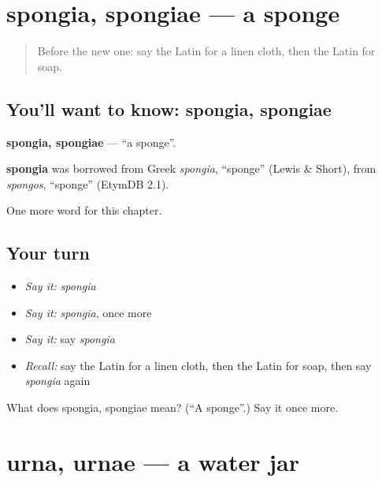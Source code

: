 \section[spongia, spongiae]{spongia, spongiae — a sponge}

\label{lesson:LA-C141-spongia}



\begin{quote}
Before the new one: say the Latin for a linen cloth, then the Latin for soap.
\end{quote}

\subsection*{You'll want to know: spongia, spongiae}
\textbf{spongia, spongiae} — \textquotedblleft{}a sponge\textquotedblright{}.

\begin{cousinweb}
\textbf{spongia} was borrowed from Greek \emph{spongia}, \textquotedblleft{}sponge\textquotedblright{} (Lewis \& Short), from \emph{spongos}, \textquotedblleft{}sponge\textquotedblright{} (EtymDB 2.1).
\end{cousinweb}

\begin{grammarlens}[title={What you've built}]
One more word for this chapter.
\end{grammarlens}

\subsection*{Your turn}
\begin{itemize}
\raggedright
  \item \emph{Say it:} \emph{spongia}
  \item \emph{Say it:} \emph{spongia}, once more
  \item \emph{Say it:} say \emph{spongia}
  \item \emph{Recall:} say the Latin for a linen cloth, then the Latin for soap, then say \emph{spongia} again
\end{itemize}

\begin{tcolorbox}[breakable,colback=teal!4,colframe=teal!35!black,title={Before you move on}]
What does spongia, spongiae mean? (\textquotedblleft{}A sponge\textquotedblright{}.) Say it once more.
\end{tcolorbox}
\section[urna, urnae]{urna, urnae — a water jar}

